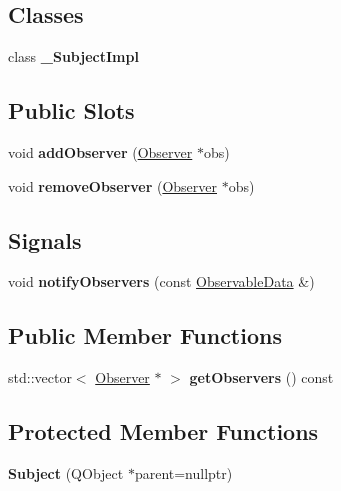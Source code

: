 \subsection*{Classes}
\begin{DoxyCompactItemize}
\item 
class {\bfseries \+\_\+\+Subject\+Impl}
\end{DoxyCompactItemize}
\subsection*{Public Slots}
\begin{DoxyCompactItemize}
\item 
\mbox{\label{class_devices_1_1_subject_a7aec3567898fc9bbebdeba8a335029f4}} 
void {\bfseries add\+Observer} (\hyperlink{class_devices_1_1_observer}{Observer} $\ast$obs)
\item 
\mbox{\label{class_devices_1_1_subject_a7cb918292445a292263e2e0f8e74903d}} 
void {\bfseries remove\+Observer} (\hyperlink{class_devices_1_1_observer}{Observer} $\ast$obs)
\end{DoxyCompactItemize}
\subsection*{Signals}
\begin{DoxyCompactItemize}
\item 
\mbox{\label{class_devices_1_1_subject_a715b3a4513893d294229ee76f2ed3cbe}} 
void {\bfseries notify\+Observers} (const \hyperlink{class_devices_1_1_observable_data}{Observable\+Data} \&)
\end{DoxyCompactItemize}
\subsection*{Public Member Functions}
\begin{DoxyCompactItemize}
\item 
\mbox{\label{class_devices_1_1_subject_adbc2b175f510857715682e571851b215}} 
std\+::vector$<$ \hyperlink{class_devices_1_1_observer}{Observer} $\ast$ $>$ {\bfseries get\+Observers} () const
\end{DoxyCompactItemize}
\subsection*{Protected Member Functions}
\begin{DoxyCompactItemize}
\item 
\mbox{\label{class_devices_1_1_subject_ac78bedb24be6afb83b4fa334badc549b}} 
{\bfseries Subject} (Q\+Object $\ast$parent=nullptr)
\end{DoxyCompactItemize}


